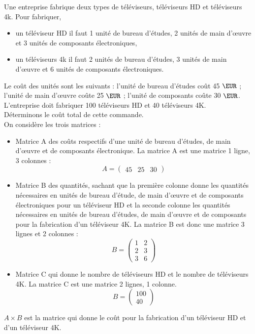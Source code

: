 \documentclass{book}
\begin{document}
\begin{Exemple}
Une entreprise fabrique deux types de téléviseurs, téléviseurs HD et téléviseurs 4k. Pour fabriquer,
\begin{itemize}
\item  un téléviseur HD il faut 1 unité de bureau d'études, 2 unités de main d'\oe uvre et 3 unités de composants électroniques,
\item un téléviseurs 4k il faut 2 unités de bureau d'études, 3 unités de main d'\oe uvre et 6 unités de composants électroniques.
\end{itemize}
Le coût des unités sont les suivants : l'unité de bureau d'études coût 45 $\EUR$ ; l'unité de main d'\oe uvre coûte 25 $\EUR$ ; l'unité de composants coûte 30 $\EUR$.\\
L'entreprise doit fabriquer 100 téléviseurs HD et 40 téléviseurs 4K.\\
Déterminons le coût total de cette commande.\\
On considère les trois matrices :
\begin{itemize}
\item Matrice A des coûts respectifs d'une unité de bureau d'études, de main d'\oe uvre et de composants électronique. La matrice A est une matrice 1 ligne, 3 colonnes :
$$A=\begin{pmatrix}
45& 25 & 30\end{pmatrix}$$
\item Matrice B des quantités, sachant que la première colonne donne les quantités nécessaires en unités de bureau d'étude, de main d'\oe uvre et de composants électroniques pour un téléviseur HD et la seconde colonne les quantités nécessaires en unités de bureau d'études, de main d'\oe uvre et de composants pour la fabrication d'un téléviseur 4K. La matrice B est donc une matrice 3 lignes et 2 colonnes :
$$B=\begin{pmatrix}
1& 2 \\
2 &3 \\
3& 6
\end{pmatrix}$$
\item Matrice C qui donne le nombre de téléviseurs HD et le nombre de téléviseurs 4K. La matrice C est une matrice 2 lignes, 1 colonne.
$$B=\begin{pmatrix}
100 \\
40
\end{pmatrix}$$
\end{itemize}
$A\times B$ est la matrice qui donne le coût pour la fabrication d'un téléviseur HD et d'un téléviseur 4K.

\end{Exemple}
\end{document}
